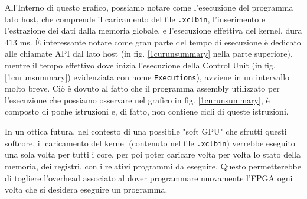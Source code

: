 \noindent All'Interno di questo grafico, possiamo notare come l'esecuzione del programma lato host, che comprende il caricamento del file \texttt{.xclbin}, l'inserimento e l'estrazione dei dati dalla memoria globale, e l'esecuzione effettiva del kernel, dura $413$ ms.
È interessante notare come gran parte del tempo di esecuzione è dedicato alle chiamate API dal lato host (in fig.  \ref{1curunsummary} nella parte superiore), mentre il tempo effettivo dove inizia l'esecuzione della Control Unit (in fig.  \ref{1curunsummary})  evidenziata con nome \texttt{Executions}), avviene in un intervallo molto breve. Ciò è dovuto al fatto che il programma assembly utilizzato per l'esecuzione che possiamo osservare nel grafico in fig. \ref{1curunsummary}, è composto di poche istruzioni e, di fatto, non contiene cicli di queste istruzioni. 

\vspace{0.3cm}

In un ottica futura, nel contesto di una possibile "soft GPU" che sfrutti questi softcore, il caricamento del kernel (contenuto nel file \texttt{.xclbin}) verrebbe eseguito una sola volta per tutti i core, per poi poter caricare volta per volta lo stato della memoria, dei registri, con i relativi programmi da eseguire. Questo permetterebbe di togliere l'overhead associato al dover programmare nuovamente l'FPGA ogni volta che si desidera eseguire un programma.
